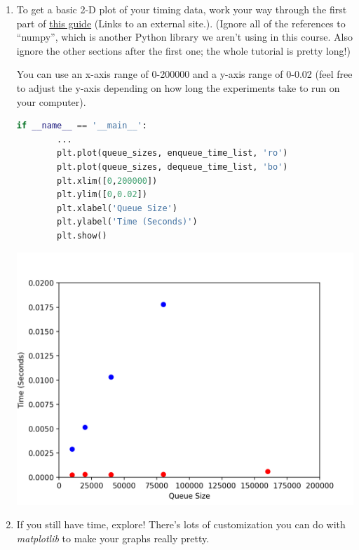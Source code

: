 \documentclass[12pt]{article}
\begin{document}
\begin{enumerate}[1.]
\begin{mdframed}
    \end{mdframed}

    \item To get a basic 2-D plot of your timing data, work your way through the
    first part of \href{https://matplotlib.org/users/pyplot_tutorial.html}{this guide} (Links to an external site.). (Ignore all of the
    references to “numpy”, which is another Python library we aren’t using in this
    course. Also ignore the other sections after the first one; the whole tutorial
    is pretty long!)

    \bigskip

    You can use an x-axis range of 0-200000 and a y-axis range of 0-0.02 (feel
    free to adjust the y-axis depending on how long the experiments take to run
    on your computer).

    \bigskip

    \begin{mdframed}

    \begin{lstlisting}[language=Python,caption={task\_4\_q1\_part\_3\_solution.py},captionpos=b]
    if __name__ == '__main__':
        ...
        plt.plot(queue_sizes, enqueue_time_list, 'ro')
        plt.plot(queue_sizes, dequeue_time_list, 'bo')
        plt.xlim([0,200000])
        plt.ylim([0,0.02])
        plt.xlabel('Queue Size')
        plt.ylabel('Time (Seconds)')
        plt.show()
    \end{lstlisting}

    \begin{center}
    \includegraphics[width=0.8 \linewidth]{../../images/lab4_t4_q1_part3_solution.png}
    \end{center}

    \end{mdframed}

    \item If you still have time, explore! There’s lots of customization you can
    do with \textit{matplotlib} to make your graphs really pretty.
\end{enumerate}
\end{document}
